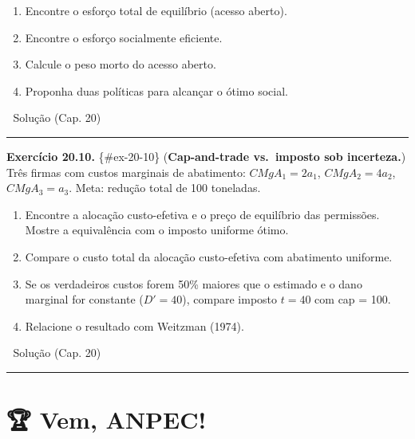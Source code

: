 \documentclass[11pt,twoside,openright]{book}
\providecommand{\tightlist}{\setlength{\itemsep}{0pt}\setlength{\parskip}{0pt}}
\begin{document}
\begin{enumerate}
\def\labelenumi{(\alph{enumi})}
\tightlist
\item
  Encontre o esforço total de equilíbrio (acesso aberto).
\item
  Encontre o esforço socialmente eficiente.
\item
  Calcule o peso morto do acesso aberto.
\item
  Proponha duas políticas para alcançar o ótimo social.
\end{enumerate}

🔑 Solução (Cap. 20)

\begin{center}\rule{0.5\linewidth}{0.5pt}\end{center}

\textbf{Exercício 20.10.} \{\#ex-20-10\} (\textbf{Cap-and-trade
vs.~imposto sob incerteza.}) Três firmas com custos marginais de
abatimento: \(CMgA_1 = 2a_1\), \(CMgA_2 = 4a_2\), \(CMgA_3 = a_3\).
Meta: redução total de 100 toneladas.

\begin{enumerate}
\def\labelenumi{(\alph{enumi})}
\tightlist
\item
  Encontre a alocação custo-efetiva e o preço de equilíbrio das
  permissões. Mostre a equivalência com o imposto uniforme ótimo.
\item
  Compare o custo total da alocação custo-efetiva com abatimento
  uniforme.
\item
  Se os verdadeiros custos forem 50\% maiores que o estimado e o dano
  marginal for constante (\(D' = 40\)), compare imposto \(t = 40\) com
  cap = 100.
\item
  Relacione o resultado com Weitzman (1974).
\end{enumerate}

🔑 Solução (Cap. 20)

\begin{center}\rule{0.5\linewidth}{0.5pt}\end{center}

\section{🏆 Vem, ANPEC!}\label{vem-anpec-2}
\end{document}
